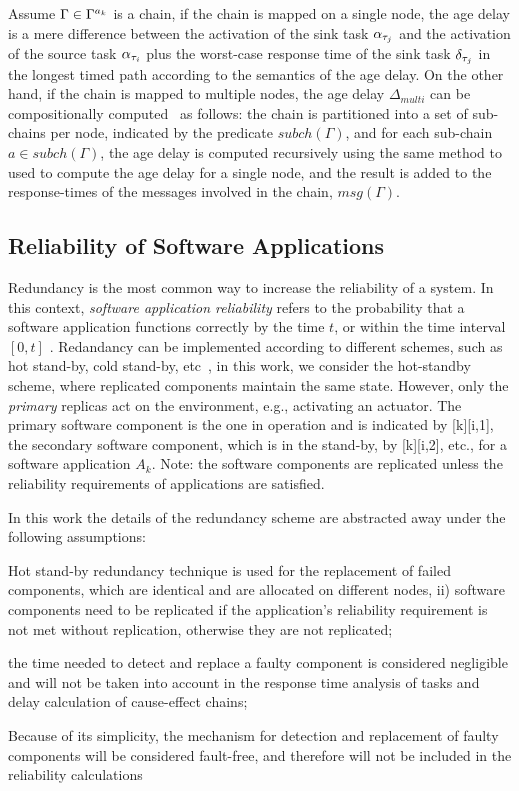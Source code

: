 {Assume $\Gamma \in \ssp{\Gamma}$ is a chain, if the chain is mapped on a single node, the age delay is a mere difference between the activation of the sink task $\ssb{\alpha}[\tau_j]$ and the activation of the source task $\ssb{\alpha}[\tau_i]$ plus the worst-case response time of the sink task $\ssb{\delta}[\tau_j]$ in the longest timed path according to the semantics of the age delay. On the other hand, if the chain is mapped to multiple nodes, the age delay $\Delta_{multi}$ can be compositionally computed~\cite{Feiertag2009ASemantics} as follows: the chain is partitioned  into a set of sub-chains per node, indicated by the predicate $subch(\Gamma)$, and for each sub-chain $a\in subch(\Gamma)$, the age delay is computed recursively using the same method to used to compute the age delay for a single node, and the result is added to the response-times of the messages involved in the chain, $msg(\Gamma)$.

\subsection{Reliability of Software Applications}\label{sub_reliability}
Redundancy is the most common way to increase the reliability of a system. In this context, \textit{software application reliability} refers to the probability that a software application functions correctly by the time $t$, or within the time interval $[0, t]$ \cite{Goel1985SoftwareApplicability}. Redandancy can be implemented according to different schemes, such as hot stand-by, cold stand-by, etc~\cite{Dubrova2013Fault-tolerantDesign}, in this work, we consider the hot-standby scheme, where replicated components maintain the same state. However, only the \textit{primary} replicas act on the environment, e.g., activating an actuator. The primary software component is the one in operation and is indicated by [k][i,1], the secondary software component, which is in the stand-by, by [k][i,2], etc., for a software application $A_k$.  Note: the software components are replicated unless the reliability requirements of applications are satisfied.

In this work the details of the redundancy scheme are abstracted away under the following assumptions:
\begin{enumerate*}[label=(\roman*)]
	\item Hot stand-by redundancy technique is used for the replacement of failed components, which are identical and are allocated on different nodes, ii) software components need to be replicated if the application's reliability requirement is not met without replication, otherwise they are not replicated;
	\item the time needed to detect and replace a faulty component is considered negligible and will not be taken into account in the response time analysis of tasks and delay calculation of cause-effect chains;
	\item Because of its simplicity, the mechanism for detection and replacement of faulty components will be considered fault-free, and therefore will not be included in the reliability calculations
\end{enumerate*}

}
